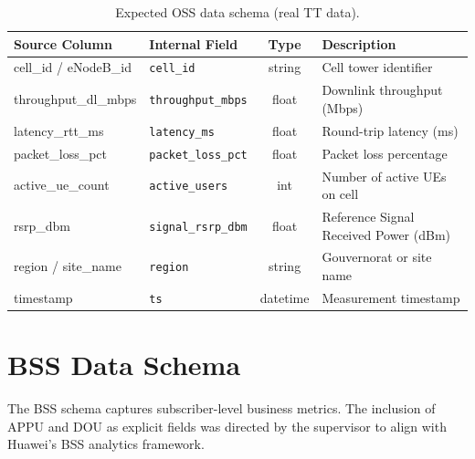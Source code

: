\begin{table}[H]
\centering
\caption{Expected OSS data schema (real TT data).}
\label{tab:oss-schema}
\begin{tabularx}{\textwidth}{@{}llcX@{}}
\toprule
\textbf{Source Column} & \textbf{Internal Field} & \textbf{Type} & \textbf{Description} \\
\midrule
cell\_id / eNodeB\_id     & \texttt{cell\_id}           & string  & Cell tower identifier \\
throughput\_dl\_mbps       & \texttt{throughput\_mbps}    & float   & Downlink throughput (Mbps) \\
latency\_rtt\_ms           & \texttt{latency\_ms}         & float   & Round-trip latency (ms) \\
packet\_loss\_pct          & \texttt{packet\_loss\_pct}   & float   & Packet loss percentage \\
active\_ue\_count          & \texttt{active\_users}       & int     & Number of active UEs on cell \\
rsrp\_dbm                  & \texttt{signal\_rsrp\_dbm}   & float   & Reference Signal Received Power (dBm) \\
region / site\_name        & \texttt{region}              & string  & Gouvernorat or site name \\
timestamp                  & \texttt{ts}                  & datetime & Measurement timestamp \\
\bottomrule
\end{tabularx}
\end{table}

\section{BSS Data Schema}

The BSS schema captures subscriber-level business metrics. The inclusion of APPU and DOU as explicit fields was directed by the supervisor to align with Huawei's BSS analytics framework.

